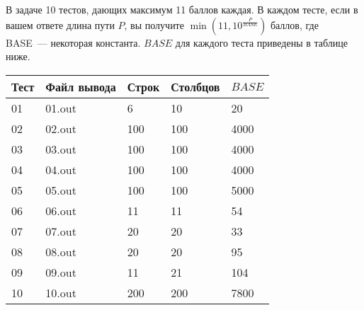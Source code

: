 В задаче 10 тестов, дающих максимум 11 баллов каждая. В каждом тесте, если в вашем ответе длина пути $P$, вы получите $\min(11, 10^\frac{P}{BASE})$ баллов, где BASE~--- некоторая константа. $BASE$ для каждого теста приведены в таблице ниже. 

\begin{tabular}{|l|l|l|l|l|}
\hline
Тест & Файл вывода & Строк & Столбцов & $BASE$\\ \hline
01 & 01.out & 6 & 10 & 20 \\ \hline
02 & 02.out & 100 & 100 & 4000 \\ \hline
03 & 03.out & 100 & 100 & 4000 \\ \hline
04 & 04.out & 100 & 100 & 4000 \\ \hline
05 & 05.out & 100 & 100 & 5000 \\ \hline
06 & 06.out & 11 & 11 & 54 \\ \hline
07 & 07.out & 20 & 20 & 33 \\ \hline
08 & 08.out & 20 & 20 & 95 \\ \hline
09 & 09.out & 11 & 21 & 104 \\ \hline
10 & 10.out & 200 & 200 & 7800 \\ \hline
\end{tabular}